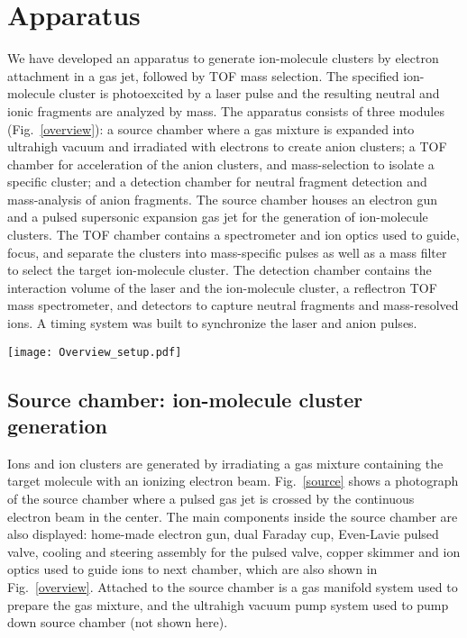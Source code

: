 \documentclass[%
aip,
rsi,
 amsmath,amssymb,
reprint,%
]{revtex4-1}
\begin{document}
\section{Apparatus} 

We have developed an apparatus to generate ion-molecule clusters by electron attachment in a gas jet, followed by TOF mass selection. The specified ion-molecule cluster is photoexcited by a laser pulse and the resulting neutral and ionic fragments are analyzed by mass. The apparatus consists of three modules (Fig.~\ref{overview}): a source chamber where a gas mixture is expanded into ultrahigh vacuum and irradiated with electrons to create anion clusters; a TOF chamber for acceleration of the anion clusters, and mass-selection to isolate a specific cluster; and a detection chamber for neutral fragment detection and mass-analysis of anion fragments. The source chamber houses an electron gun and a pulsed supersonic expansion gas jet for the generation of ion-molecule clusters. The TOF chamber contains a spectrometer and ion optics used to guide, focus, and separate the clusters into mass-specific pulses as well as a mass filter to select the target ion-molecule cluster. The detection chamber contains the interaction volume of the laser and the ion-molecule cluster, a reflectron TOF mass spectrometer, and detectors to capture neutral fragments and mass-resolved ions. A timing system was built to synchronize the laser and anion pulses. 

\begin{figure*}
\centering
\texttt{[image: Overview\_setup.pdf]}
\caption{Overview of the main components of the apparatus, consisting of the source chamber, TOF chamber and detection chamber. The gas manifold system, pump system and electronic control system are not shown here. }
\label{overview}
\end{figure*}

\subsection{Source chamber: ion-molecule cluster generation}

Ions and ion clusters are generated by irradiating a gas mixture containing the target molecule with an ionizing electron beam. Fig.~\ref{source} shows a photograph of the source chamber where a pulsed gas jet is crossed by the continuous electron beam in the center. The main components inside the source chamber are also displayed: home-made electron gun, dual Faraday cup, Even-Lavie pulsed valve\cite{even_even-lavie_2015}, cooling and steering assembly for the pulsed valve, copper skimmer and ion optics used to guide ions to next chamber, which are also shown in Fig.~\ref{overview}. Attached to the source chamber is a gas manifold system used to prepare the gas mixture, and the ultrahigh vacuum pump system used to pump down source chamber (not shown here). 
\end{document}
